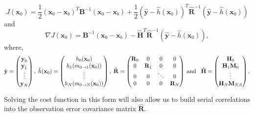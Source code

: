 \documentclass[11pt]{article}
\begin{document}
\begin{equation}
J(\textbf{x}_0) = \frac{1}{2}(\textbf{x}_0-\textbf{x}_b)^{T}\textbf{B}^{-1}(\textbf{x}_0-\textbf{x}_b)+\frac{1}{2}(\hat{\textbf{y}}-\hat{h}(\textbf{x}_0))^{T}\hat{\textbf{R}}^{-1}(\hat{\textbf{y}}-\hat{h}(\textbf{x}_0)) \label{costfn}
\end{equation}
and
\begin{equation}
\nabla J(\textbf{x}_0) = \textbf{B}^{-1}(\textbf{x}_0-\textbf{x}_b)-\hat{\mathbf{H}}^{T}\hat{\textbf{R}}^{-1}(\hat{\textbf{y}}-\hat{h}(\textbf{x}_0)), \label{gradcostfn}
\end{equation}
where,
\begin{equation}
\hat{\textbf{y}}=
\begin{pmatrix}
\textbf{y}_0 \\
\textbf{y}_1\\
\vdots \\
\textbf{y}_N
\end{pmatrix},
\hspace{1mm}
\hat{h}(\textbf{x}_0)=
\begin{pmatrix}
h_0(\textbf{x}_0) \\
h_1(m_{0\rightarrow 1}(\mathbf{x}_{0}))\\
\vdots \\
h_N(m_{0\rightarrow N}(\mathbf{x}_{0}))
\end{pmatrix},
\hspace{1mm}
\hat{\mathbf{R}}=
\begin{pmatrix}
\mathbf{R}_0 & 0 & 0 & 0 \\
0 & \mathbf{R}_1 & 0 & 0 \\
0 & 0 & \ddots & 0 \\
0 & 0 & 0 & \mathbf{R}_N
\end{pmatrix}
\hspace{1mm} \text{and} \hspace{3mm}
\hat{\mathbf{H}}=
\begin{pmatrix}
\mathbf{H}_0 \\
\mathbf{H}_1\mathbf{M}_0\\
\vdots \\
\mathbf{H}_N\mathbf{M}_{N,0}
\end{pmatrix}.
\end{equation}

Solving the cost function in this form will also allow us to build serial correlations into the observation error covariance matrix $\hat{\mathbf{R}}$.
\end{document}
